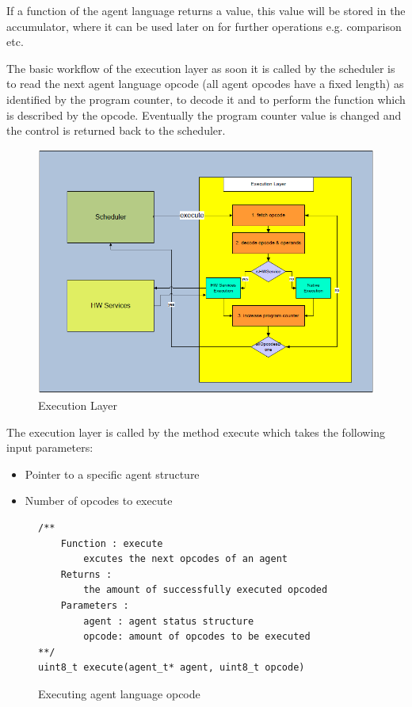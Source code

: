 \documentclass{scrreprt}
\begin{document}
\noindent
If a function of the agent language returns a value, this value will be stored in the accumulator, 
where it can be used later on for further operations e.g. comparison etc. 


\noindent
The basic workflow of the execution layer as soon it is called by the scheduler is to read the next 
agent language opcode (all agent opcodes have a fixed length) as identified by the program counter, 
to decode it and to perform the function which is described by the opcode. Eventually the program 
counter value is changed and the control is returned back to the scheduler. 

\begin{figure}[!htbp]
\begin{center}
\includegraphics[scale=0.4]{figures/exelayer.png}
\caption{Execution Layer}
\end{center}
\label{exelayer}
\end{figure}



The execution layer is 
called by the method execute which takes the following input parameters:
\begin{itemize}
 \item Pointer to a specific agent structure
 \item Number of opcodes to execute
\end{itemize}

\begin{figure}[!htb]
\lstset{language=C}
\begin{lstlisting}[frame=single]
/**
	Function : execute
		excutes the next opcodes of an agent
	Returns : 
		the amount of successfully executed opcoded
	Parameters : 
		agent : agent status structure
		opcode: amount of opcodes to be executed
**/
uint8_t execute(agent_t* agent, uint8_t opcode)
\end{lstlisting}
\caption{Executing agent language opcode}
\label{fig:excopc}
\end{figure}
\end{document}
